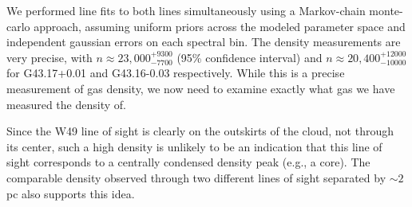 We performed line fits to both lines simultaneously using a Markov-chain
monte-carlo approach, assuming uniform priors across the modeled parameter
space and independent gaussian errors on each spectral bin.  The density
measurements are very precise, with $n\approx23,000 {}^{+9300}_{-7700}$ \percc
(95\% confidence interval) and $n\approx 20,400 {}^{+12000}_{-10000}$ \percc for
G43.17+0.01 and G43.16-0.03 respectively.  While this is a precise measurement
of gas density, we now need to examine exactly what gas we have measured the
density of.



Since the W49 line of sight is clearly on the outskirts of the cloud, not
through its center, such a high density is unlikely to be an indication that
this line of sight corresponds to a centrally condensed density peak (e.g., a
core).  The comparable density observed through two different lines of sight
separated by $\sim 2$ pc also supports this idea.





